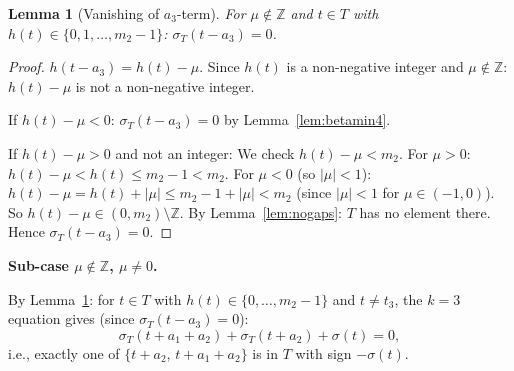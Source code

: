 \documentclass{article}
\newtheorem{lemma}{Lemma}
\begin{document}
\begin{lemma}[Vanishing of $a_3$-term]\label{lem:a3vanish}
For $\mu\notin\mathbb{Z}$ and $t\in T$ with $h(t)\in\{0,1,\dots,m_2-1\}$\textup{:}
$\sigma_T(t-a_3)=0$.
\end{lemma}
\begin{proof}
$h(t-a_3)=h(t)-\mu$.
Since $h(t)$ is a non-negative integer and $\mu\notin\mathbb{Z}$:
$h(t)-\mu$ is not a non-negative integer.

If $h(t)-\mu<0$: $\sigma_T(t-a_3)=0$ by Lemma~\ref{lem:betamin4}.

If $h(t)-\mu>0$ and not an integer: We check $h(t)-\mu<m_2$.
For $\mu>0$: $h(t)-\mu<h(t)\le m_2-1<m_2$.  For $\mu<0$ (so $|\mu|<1$):
$h(t)-\mu=h(t)+|\mu|\le m_2-1+|\mu|<m_2$ (since $|\mu|<1$ for $\mu\in(-1,0)$).
So $h(t)-\mu\in(0,m_2)\setminus\mathbb{Z}$.  By Lemma~\ref{lem:nogaps}: $T$ has no element there.
Hence $\sigma_T(t-a_3)=0$.
\end{proof}

\medskip
\noindent\textbf{Sub-case $\mu\notin\mathbb{Z}$, $\mu\ne 0$.}

By Lemma~\ref{lem:a3vanish}: for $t\in T$ with $h(t)\in\{0,\dots,m_2-1\}$ and $t\ne t_3$,
the $k=3$ equation gives (since $\sigma_T(t-a_3)=0$):
\begin{equation}\label{eq:3term4}
  \sigma_T(t+a_1+a_2)+\sigma_T(t+a_2)+\sigma(t)=0,
\end{equation}
i.e., exactly one of $\{t+a_2,\,t+a_1+a_2\}$ is in $T$ with sign $-\sigma(t)$.
\end{document}

